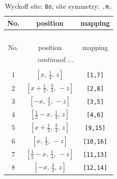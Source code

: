 \documentclass[fleqn,8pt]{jsarticle}
\begin{document}
\begin{longtable}{ccc}
\caption{Wyckoff site: {\tt 8o}, site symmetry: {\tt .m.}}
 \\
 \hline \hline
No. & position & mapping \\ \hline \endfirsthead

\multicolumn{2}{l}{\tablename\ \thetable{}} \\
 \hline \hline
No. & position & mapping \\ \hline \endhead

 \hline \hline
\multicolumn{2}{r}{\footnotesize\it continued ...} \\ \endfoot

 \hline \hline
\multicolumn{2}{r}{} \\ \endlastfoot

1 & $\left[ x,\, \frac{1}{4},\, z \right]$ & {\tt [1,7]} \\ \hline
2 & $\left[ x + \frac{1}{2},\, \frac{3}{4},\, - z \right]$ & {\tt [2,8]} \\ \hline
3 & $\left[ - x,\, \frac{3}{4},\, - z \right]$ & {\tt [3,5]} \\ \hline
4 & $\left[ \frac{1}{2} - x,\, \frac{1}{4},\, z \right]$ & {\tt [4,6]} \\ \hline
5 & $\left[ x + \frac{1}{2},\, \frac{3}{4},\, z \right]$ & {\tt [9,15]} \\ \hline
6 & $\left[ x,\, \frac{1}{4},\, - z \right]$ & {\tt [10,16]} \\ \hline
7 & $\left[ \frac{1}{2} - x,\, \frac{1}{4},\, - z \right]$ & {\tt [11,13]} \\ \hline
8 & $\left[ - x,\, \frac{3}{4},\, z \right]$ & {\tt [12,14]} \\
\end{longtable}
\renewcommand{\arraystretch}{1.2}
\end{document}
